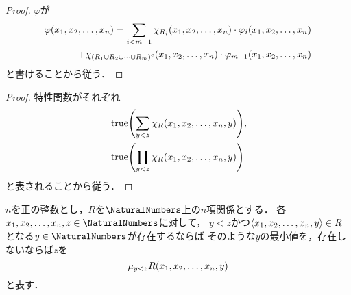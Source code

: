 \begin{proof}
	\(\varphi\)が
	\begin{align*}
		\apply{\varphi}{x_1, x_2, \dots, x_n} = \sum_{i < m+1} \apply{\characteristicfunction{R_i}}{x_1, x_2, \dots, x_n} \cdot \apply{\varphi_i}{x_1, x_2, \dots, x_n} \\
		\quad + \apply{\characteristicfunction{\complementset{\paren{R_1 \cup R_2 \cup \dotsb \cup R_m}}}}{x_1, x_2, \dots, x_n} \cdot \apply{\varphi_{m+1}}{x_1, x_2, \dots, x_n}
	\end{align*}
	と書けることから従う．
\end{proof}


\begin{proof}
	特性関数がそれぞれ
	\begin{align*}
		 & \apply{\truefunction}{\sum_{y < z} \apply{\characteristicfunction{R}}{x_1, x_2, \dots, x_n, y}}, \\
		 & \apply{\truefunction}{\prod_{y < z} \apply{\characteristicfunction{R}}{x_1, x_2, \dots, x_n, y}} \\
	\end{align*}
	と表されることから従う．
\end{proof}

\begin{Def} \label{Def:boundedmuoperator}
	\(n\)を正の整数とし，\(R\)を\(\NaturalNumbers\)上の\(n\)項関係とする．
	各\(x_1, x_2, \dots, x_n, z \in \NaturalNumbers\)に対して，
	\(y < z\)かつ\(\langle x_1, x_2, \dots, x_n, y \rangle \in R\)となる\(y \in \NaturalNumbers\)が存在するならば
	そのような\(y\)の最小値を，存在しないならば\(z\)を
	\begin{equation}
		\muoperator_{y < z} \apply{R}{x_1, x_2, \dots, x_n, y}
		\label{eq:boundedmuoperator}
	\end{equation}
	と表す．
\end{Def}

